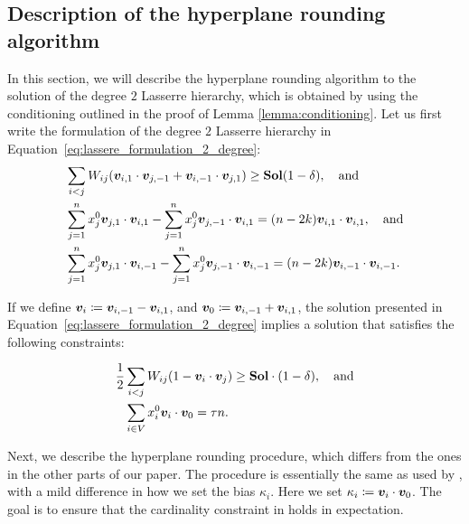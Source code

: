 \subsection{Description of the hyperplane rounding algorithm}
\label{appendix:lesserre:rounding}
In this section, we will describe the hyperplane rounding algorithm to the solution of the degree $2$ Lasserre hierarchy, which is obtained by using the conditioning outlined in the proof of Lemma \ref{lemma:conditioning}. 
Let us first write the formulation of the degree $2$ Lasserre hierarchy in
Equation~\eqref{eq:lassere_formulation_2_degree}:
\begin{equation}\label{eq:lassere_formulation_2_degree}
	\begin{aligned}
		& \sum_{ i < j } W_{ij} (\bm{v}_{i,1} \cdot \bm{v}_{j,-1} + \bm{v}_{i,-1} \cdot \bm{v}_{j,1}) \geq \mathbf{Sol} (1-\delta), \quad \textrm{and}  \\
		 &  \sum_{j=1}^n x_j^0 \bm{v}_{j,1} \cdot \bm{v}_{i,1} - \sum_{j=1}^n x_j^0 \bm{v}_{j,-1} \cdot \bm{v}_{i,1} = (n-2k) \bm{v}_{i,1} \cdot \bm{v}_{i,1}, \quad \textrm{and}\\
  &  \sum_{j=1}^n x_j^0 \bm{v}_{j,1} \cdot \bm{v}_{i,-1} - \sum_{j=1}^n x_j^0 \bm{v}_{j,-1} \cdot \bm{v}_{i,-1} = (n-2k) \bm{v}_{i,-1} \cdot \bm{v}_{i,-1}.\\
	\end{aligned}
\end{equation}

If we define $\bm{v}_i \coloneqq \bm{v}_{i, -1} - \bm{v}_{i, 1}$, 
and $\bm{v}_0 \coloneqq \bm{v}_{i, -1} + \bm{v}_{i, 1}$, 
the solution presented in Equation~\eqref{eq:lassere_formulation_2_degree} implies a solution that satisfies the following constraints:

\begin{equation*}
	\begin{split}
		\frac{1}{2}	& \sum_{i<j}W_{ij} (1-\bm{v}_i \cdot \bm{v}_j) \geq \mathbf{Sol} \cdot (1- \delta), \quad \textrm{and}\\
		 &\sum_{i \in V} x_i^0 \bm{v}_i\cdot \bm{v}_0   = \tau n.
	\end{split}
\end{equation*}

Next, we describe the hyperplane rounding procedure, which differs from the ones
in the other parts of our paper. 
The procedure is essentially the same as used by \citet[Section 5.4]{DBLP:conf/soda/RaghavendraT12}, with a mild difference in how we set the bias $\kappa_i$. Here we set $\kappa_i \coloneqq \bm{v}_i \cdot \bm{v}_0$. 
The goal is to ensure that the cardinality constraint in \maxcutkc holds in expectation.

